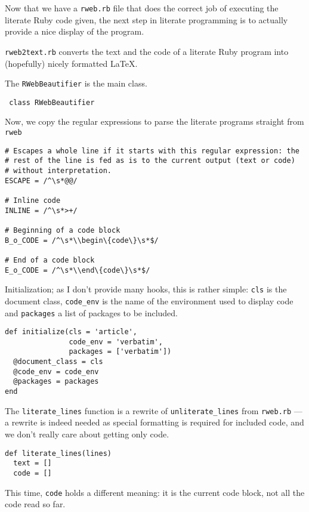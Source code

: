 \documentclass{article}
\begin{document}
Now that we have a \verb|rweb.rb| file that does the correct job
of executing the literate Ruby code given, the next step in literate
programming is to actually provide a nice display of the program.

\verb|rweb2text.rb| converts the text and the code of a literate Ruby
program into (hopefully) nicely formatted LaTeX.

The \verb|RWebBeautifier| is the main class.

\begin{verbatim}
 class RWebBeautifier
\end{verbatim}

Now, we copy the regular expressions to parse the literate programs
straight from \verb|rweb|

\begin{verbatim}
# Escapes a whole line if it starts with this regular expression: the
# rest of the line is fed as is to the current output (text or code)
# without interpretation.
ESCAPE = /^\s*@@/

# Inline code
INLINE = /^\s*>+/

# Beginning of a code block
B_o_CODE = /^\s*\\begin\{code\}\s*$/

# End of a code block
E_o_CODE = /^\s*\\end\{code\}\s*$/
\end{verbatim}

Initialization; as I don't provide many hooks, this is rather simple:
\verb|cls| is the document class, \verb|code_env| is the name of
the environment used to display code and \verb|packages|
a list of packages to be included.
\begin{verbatim}
def initialize(cls = 'article', 
               code_env = 'verbatim', 
               packages = ['verbatim'])
  @document_class = cls
  @code_env = code_env
  @packages = packages
end
\end{verbatim}

The \verb|literate_lines| function is a rewrite of
\verb|unliterate_lines| from \verb|rweb.rb| --- a rewrite is indeed
needed as special formatting is required for included code, and
we don't really care about getting only code.

\begin{verbatim}
def literate_lines(lines)
  text = []
  code = []
\end{verbatim}

This time, \verb|code| holds a different meaning: it is the current code
block, not all the code read so far.
\end{document}
